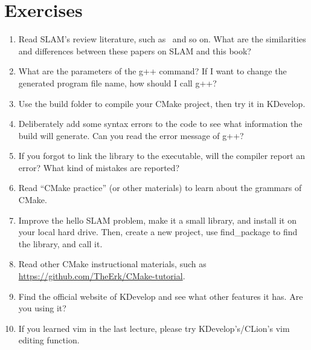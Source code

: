\section*{Exercises}
\begin{enumerate}
    \item[\optional] Read SLAM's review literature, such as~\cite{Cadena2016, Fuentes-Pacheco2015, Boal2014, Chen2012, Chen2007} and so on. What are the similarities and differences between these papers on SLAM and this book?
    \item What are the parameters of the g++ command? If I want to change the generated program file name, how should I call g++?
    \item Use the build folder to compile your CMake project, then try it in KDevelop.
    \item Deliberately add some syntax errors to the code to see what information the build will generate. Can you read the error message of g++?
    \item If you forgot to link the library to the executable, will the compiler report an error? What kind of mistakes are reported?
    \item[\optional] Read ``CMake practice'' (or other materials) to learn about the grammars of CMake.
    \item[\optional] Improve the hello SLAM problem, make it a small library, and install it on your local hard drive. Then, create a new project, use find\_package to find the library, and call it.
    \item[\optional] Read other CMake instructional materials, such as \url{https://github.com/TheErk/CMake-tutorial}.
    \item Find the official website of KDevelop and see what other features it has. Are you using it?
    \item If you learned vim in the last lecture, please try KDevelop's/CLion's vim editing function.
\end{enumerate}